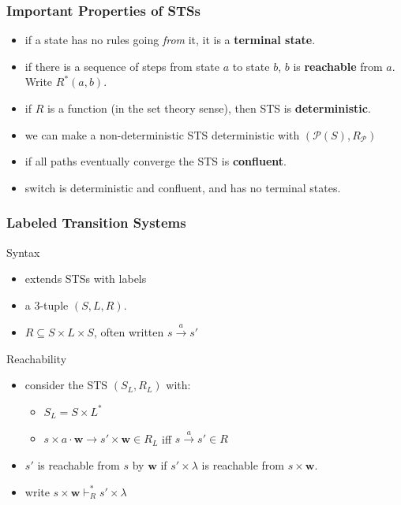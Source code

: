 \documentclass{beamer}
\begin{document}

\begin{frame}
\frametitle{Important Properties of STSs}
\begin{itemize}
\item if a state has no rules going \textit{from} it, it is a \textbf{terminal
    state}.
\item if there is a sequence of steps from state $a$ to state $b$, $b$ is
  \textbf{reachable} from $a$. Write $R^*(a, b)$.
\item if $R$ is a function (in the set theory sense), then STS is \textbf{deterministic}.
\item we can make a non-deterministic STS deterministic with $(\mathcal{P}(S), R_\mathcal{P})$
\item if all paths eventually converge the STS is \textbf{confluent}.
\item switch is deterministic and confluent, and has no terminal states.
\end{itemize}
\end{frame}


\begin{frame}
\frametitle{Labeled Transition Systems}
\begin{block}{Syntax}
\begin{itemize}
\item extends STSs with labels
\item a 3-tuple $(S, L, R)$.
\item $R \subseteq S \times L \times S$, often written $s \xrightarrow{a} s'$
\end{itemize}
\end{block}
\begin{block}{Reachability}
\begin{itemize}
\item consider the STS $(S_L, R_L)$ with:
  \begin{itemize}
  \item $S_L = S \times L^*$
  \item $s \times a \cdot \mathbf{w} \rightarrow s' \times \mathbf{w} \in R_L$
    iff $s \xrightarrow{a} s' \in R$ 
   \end{itemize}
\item $s'$ is reachable from $s$ by $\mathbf{w}$ if $s' \times \lambda$ is
      reachable from $s \times \mathbf{w}$.
    \item write $s \times \mathbf{w} \vdash_{R}^* s' \times \lambda$
\end{itemize}
\end{block}
\end{frame}
\end{document}
